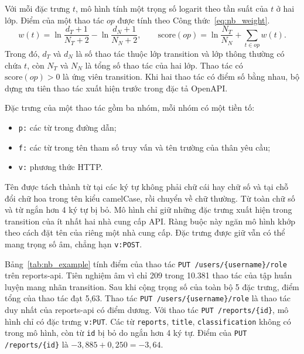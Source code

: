 Với mỗi đặc trưng $t$, mô hình tính một trọng số logarit theo tần suất của $t$ ở hai lớp. Điểm của một thao tác $op$ được tính theo Công thức~\eqref{eq:nb_weight}.
\begin{equation}
  w(t) = \ln\frac{d_T + 1}{N_T + 2} - \ln\frac{d_N + 1}{N_N + 2}, \qquad
  \mathrm{score}(op) = \ln\frac{N_T}{N_N} + \sum_{t \in op} w(t).
  \label{eq:nb_weight}
\end{equation}
Trong đó, $d_T$ và $d_N$ là số thao tác thuộc lớp transition và lớp thông thường có chứa $t$, còn $N_T$ và $N_N$ là tổng số thao tác của hai lớp. Thao tác có $\mathrm{score}(op) > 0$ là ứng viên transition. Khi hai thao tác có điểm số bằng nhau, bộ dựng ưu tiên thao tác xuất hiện trước trong đặc tả OpenAPI.

Đặc trưng của một thao tác gồm ba nhóm, mỗi nhóm có một tiền tố:
\begin{itemize}
    \item \texttt{p:} các từ trong đường dẫn;
    \item \texttt{f:} các từ trong tên tham số truy vấn và tên trường của thân yêu cầu;
    \item \texttt{v:} phương thức HTTP.
\end{itemize}
Tên được tách thành từ tại các ký tự không phải chữ cái hay chữ số và tại chỗ đổi chữ hoa trong tên kiểu camelCase, rồi chuyển về chữ thường. Từ toàn chữ số và từ ngắn hơn 4 ký tự bị bỏ. Mô hình chỉ giữ những đặc trưng xuất hiện trong transition của ít nhất hai nhà cung cấp API. Ràng buộc này ngăn mô hình khớp theo cách đặt tên của riêng một nhà cung cấp. Đặc trưng được giữ vẫn có thể mang trọng số âm, chẳng hạn \texttt{v:POST}.

Bảng~\ref{tab:nb_example} tính điểm của thao tác \texttt{PUT /users/\{username\}/role} trên reports-api. Tiên nghiệm âm vì chỉ 209 trong 10.381 thao tác của tập huấn luyện mang nhãn transition. Sau khi cộng trọng số của toàn bộ 5 đặc trưng, điểm tổng của thao tác đạt 5,63. Thao tác \texttt{PUT /users/\{username\}/role} là thao tác duy nhất của reports-api có điểm dương. Với thao tác \texttt{PUT /reports/\{id\}}, mô hình chỉ có đặc trưng \texttt{v:PUT}. Các từ \texttt{reports}, \texttt{title}, \texttt{classification} không có trong mô hình, còn từ \texttt{id} bị bỏ do ngắn hơn 4 ký tự. Điểm của \texttt{PUT /reports/\{id\}} là $-3{,}885 + 0{,}250 = -3{,}64$.


